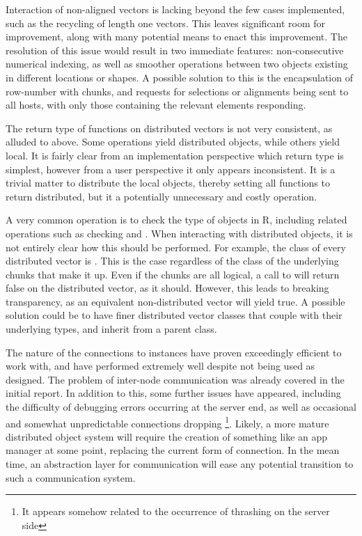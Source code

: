 Interaction of non-aligned vectors is lacking beyond the few cases
implemented, such as the recycling of length one vectors. This leaves
significant room for improvement, along with many potential means to
enact this improvement. The resolution of this issue would result in two
immediate features: non-consecutive numerical indexing, as well as
smoother operations between two objects existing in different locations
or shapes. A possible solution to this is the encapsulation of
row-number with chunks, and requests for selections or alignments being
sent to all hosts, with only those containing the relevant elements
responding.

The return type of functions on distributed vectors is not very
consistent, as alluded to above. Some operations yield
distributed objects, while others yield local. It is fairly clear from
an implementation perspective which return type is simplest, however
from a user perspective it only appears inconsistent. It is a trivial
matter to distribute the local objects, thereby setting all functions to
return distributed, but it a potentially unnecessary and costly
operation.

A very common operation is to check the type of objects in R, including
related operations such as checking  and
. When interacting with distributed objects, it is not
entirely clear how this should be performed. For example, the class of
every distributed vector is . This is the
case regardless of the class of the underlying chunks that make it up.
Even if the chunks are all logical, a call to  will
return false on the distributed vector, as it should. However, this
leads to breaking transparency, as an equivalent non-distributed vector
will yield true. A possible solution could be to have finer distributed
vector classes that couple with their underlying types, and inherit from
a parent  class.

The nature of the connections to  instances have proven
exceedingly efficient to work with, and have performed extremely well
despite not being used as designed. The problem of inter-node
communication was already covered in the initial report. In addition to
this, some further issues have appeared, including the difficulty of
debugging errors occurring at the server end, as well as occasional and
somewhat unpredictable connections dropping \footnote{It appears somehow
  related to the occurrence of thrashing on the server side}. Likely, a
more mature distributed object system will require the creation of
something like an app manager at some point, replacing the current
 form of connection. In the mean time, an abstraction layer for
communication will ease any potential transition to such a communication
system.

